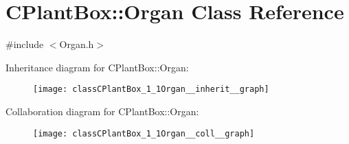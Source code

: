 \hypertarget{classCPlantBox_1_1Organ}{}\section{C\+Plant\+Box\+:\+:Organ Class Reference}
\label{classCPlantBox_1_1Organ}


{\ttfamily \#include $<$Organ.\+h$>$}



Inheritance diagram for C\+Plant\+Box\+:\+:Organ\+:\nopagebreak
\begin{figure}[H]
\begin{center}
\leavevmode
\texttt{[image: classCPlantBox\_1\_1Organ\_\_inherit\_\_graph]}
\end{center}
\end{figure}


Collaboration diagram for C\+Plant\+Box\+:\+:Organ\+:\nopagebreak
\begin{figure}[H]
\begin{center}
\leavevmode
\texttt{[image: classCPlantBox\_1\_1Organ\_\_coll\_\_graph]}
\end{center}
\end{figure}
